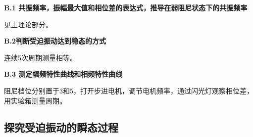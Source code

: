 \documentclass[a4paper,11pt]{article}
\begin{document}
        \textbf{B.1 共振频率，振幅最大值和相位差的表达式，推导在弱阻尼状态下的共振频率}

        见上理论部分。

        \textbf{B.2判断受迫振动达到稳态的方式}

        连续5次周期测量相等。

        \textbf{B.3 测定幅频特性曲线和相频特性曲线}

        阻尼档位分别置于3和5，打开步进电机，调节电机频率，通过闪光灯观察相位差，用实验箱测量周期。

        





    \subsection{探究受迫振动的瞬态过程}
\end{document}

